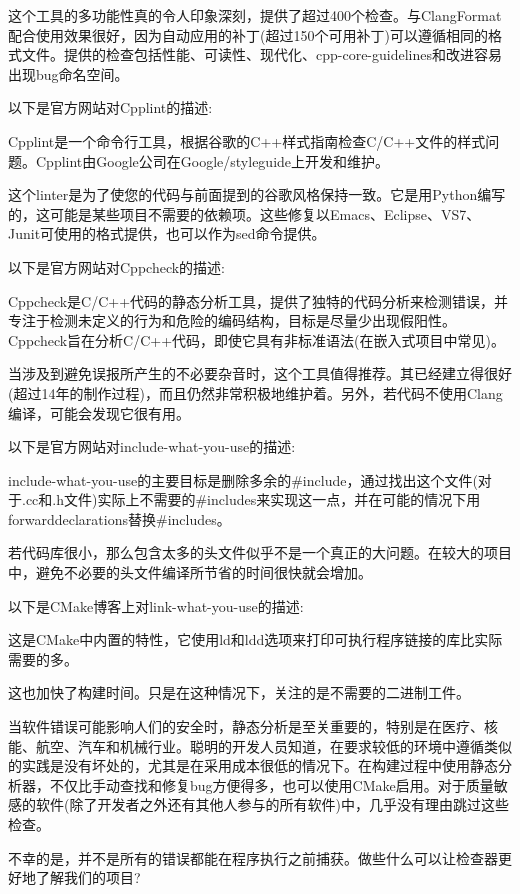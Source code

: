 这个工具的多功能性真的令人印象深刻，提供了超过400个检查。与ClangFormat配合使用效果很好，因为自动应用的补丁(超过150个可用补丁)可以遵循相同的格式文件。提供的检查包括性能、可读性、现代化、cpp-core-guidelines和改进容易出现bug命名空间。



以下是官方网站对Cpplint的描述:

Cpplint是一个命令行工具，根据谷歌的C++样式指南检查C/C++文件的样式问题。Cpplint由Google公司在Google/styleguide上开发和维护。

这个linter是为了使您的代码与前面提到的谷歌风格保持一致。它是用Python编写的，这可能是某些项目不需要的依赖项。这些修复以Emacs、Eclipse、VS7、Junit可使用的格式提供，也可以作为sed命令提供。


以下是官方网站对Cppcheck的描述:

Cppcheck是C/C++代码的静态分析工具，提供了独特的代码分析来检测错误，并专注于检测未定义的行为和危险的编码结构，目标是尽量少出现假阳性。Cppcheck旨在分析C/C++代码，即使它具有非标准语法(在嵌入式项目中常见)。

当涉及到避免误报所产生的不必要杂音时，这个工具值得推荐。其已经建立得很好(超过14年的制作过程)，而且仍然非常积极地维护着。另外，若代码不使用Clang编译，可能会发现它很有用。



以下是官方网站对include-what-you-use的描述:

include-what-you-use的主要目标是删除多余的\#include，通过找出这个文件(对于.cc和.h文件)实际上不需要的\#includes来实现这一点，并在可能的情况下用forwarddeclarations替换\#includes。

若代码库很小，那么包含太多的头文件似乎不是一个真正的大问题。在较大的项目中，避免不必要的头文件编译所节省的时间很快就会增加。


以下是CMake博客上对link-what-you-use的描述:

这是CMake中内置的特性，它使用ld和ldd选项来打印可执行程序链接的库比实际需要的多。

这也加快了构建时间。只是在这种情况下，关注的是不需要的二进制工件。

当软件错误可能影响人们的安全时，静态分析是至关重要的，特别是在医疗、核能、航空、汽车和机械行业。聪明的开发人员知道，在要求较低的环境中遵循类似的实践是没有坏处的，尤其是在采用成本很低的情况下。在构建过程中使用静态分析器，不仅比手动查找和修复bug方便得多，也可以使用CMake启用。对于质量敏感的软件(除了开发者之外还有其他人参与的所有软件)中，几乎没有理由跳过这些检查。

不幸的是，并不是所有的错误都能在程序执行之前捕获。做些什么可以让检查器更好地了解我们的项目?


